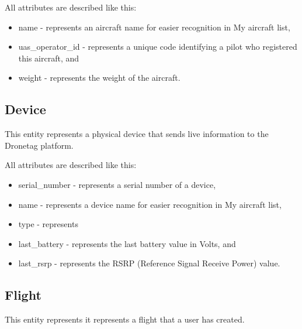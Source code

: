 All attributes are described like this:
\begin{itemize}
    \item name - represents an aircraft name for easier recognition in My aircraft list,
    \item uas\_operator\_id - represents a unique code identifying a pilot who registered this aircraft, and
    \item weight - represents the weight of the aircraft.
\end{itemize}

\subsection{Device}\label{subsec:device}
This entity represents a physical device that sends live information to the Dronetag platform.

All attributes are described like this:
\begin{itemize}
    \item serial\_number - represents a serial number of a device,
    \item name - represents a device name for easier recognition in My aircraft list,
    \item type - represents
    \item last\_battery - represents the last battery value in Volts, and
    \item last\_rsrp - represents the RSRP (Reference Signal Receive Power) value.
\end{itemize}

\subsection{Flight}\label{subsec:flight}
This entity represents it represents a flight that a user has created.

